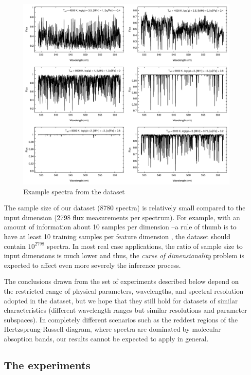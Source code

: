 \documentclass[a4paper,fleqn,usenatbib]{mnras}
\begin{document}
{{{\begin{figure}
\centering\includegraphics[width=\textwidth]{espectros.pdf}
\caption{Example spectra from the dataset}
\label{fig:ejemplosEspectros}
\end{figure}

The sample size of our dataset (8780 spectra) is relatively
small compared to the input dimension (2798 flux measurements
per spectrum). For example, with an amount of information 
about 10 samples per dimension --a rule of thumb is to have at 
least 10 training samples per feature dimension \citep{jain:00}, 
the dataset should contain $10^{2798}$ spectra.
In most real case applications, the ratio of sample size to input 
dimensions is much lower and thus, the \textit{curse of dimensionality} 
problem is expected to affect even more severely the inference process. 

The conclusions drawn from the set of experiments described below
depend on the restricted range of physical parameters, wavelengths,
and spectral resolution adopted in the dataset, but we hope that they
still hold for datasets of similar characteristics (different
wavelength ranges but similar resolutions and parameter subspaces). In
completely different scenarios such as the reddest regions of the
Hertzsprung-Russell diagram, where spectra are dominated by molecular
absoption bands, our results cannot be expected to apply in general.

\subsection{The experiments}
\label{sec:modelling}

}}}
\end{document}
